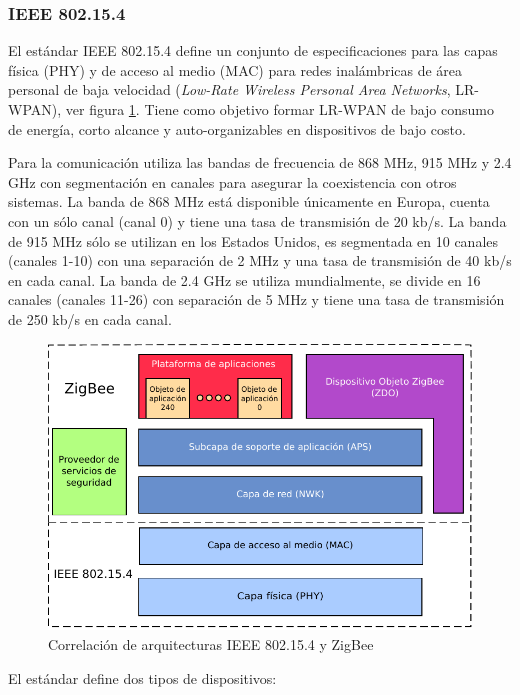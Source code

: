 \subsubsection{IEEE 802.15.4}

El estándar IEEE 802.15.4\cite{ieee:overview} define un conjunto de especificaciones para las capas física (PHY) y de acceso al medio (MAC) para redes inalámbricas de área personal de baja velocidad (\textit{Low-Rate Wireless Personal Area Networks}, LR-WPAN), ver figura \ref{img:ieee_zigbee}. Tiene como objetivo formar LR-WPAN de bajo consumo de energía, corto alcance y auto-organizables en dispositivos de bajo costo. 

Para la comunicación utiliza las bandas de frecuencia de 868 MHz, 915 MHz y 2.4 GHz con segmentación en canales para asegurar la coexistencia con otros sistemas. La banda de 868 MHz está disponible únicamente en Europa, cuenta con un sólo canal (canal 0) y tiene una tasa de transmisión de 20 kb/s. La banda de 915 MHz sólo se utilizan en los Estados Unidos, es segmentada en 10 canales (canales 1-10) con una separación de 2 MHz y una tasa de transmisión de 40 kb/s en cada canal. La banda de 2.4 GHz se utiliza mundialmente, se divide en 16 canales (canales 11-26) con separación de 5 MHz y tiene una tasa de transmisión de 250 kb/s en cada canal. 


\begin{figure}
	\centering
	\includegraphics[scale=0.9]{capitulo_2_imgs/zigbee_arquitectura.pdf}
	\caption{Correlación de arquitecturas IEEE 802.15.4 y ZigBee}
	\label{img:ieee_zigbee}
\end{figure}

El estándar define dos tipos de dispositivos: 

